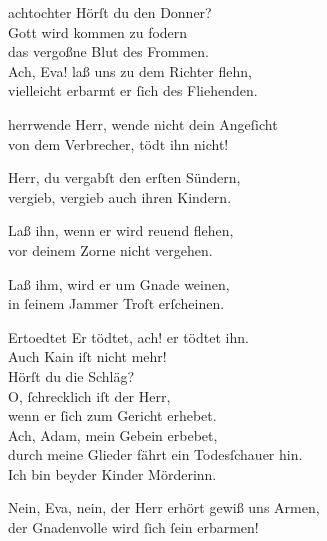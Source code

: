 \documentclass[tocstyle=ref-genre]{ees}
\begin{document}
{\begin{movement}{achtochter}
  \voice[Adam]
  Hörſt du den Donner?\\
  Gott wird kommen zu fodern\\
  das vergoßne Blut des Frommen.\\
  Ach, Eva! laß uns zu dem Richter flehn,\\
  vielleicht erbarmt er ſich des Fliehenden.
\end{movement}

\begin{movement}{herrwende}
  \voice[Adam]
  Herr, wende nicht dein Angeſicht\\
  von dem Verbrecher, tödt ihn nicht!

  \voice[Eva]
  Herr, du vergabſt den erſten Sündern,\\
  vergieb, vergieb auch ihren Kindern.

  \voice[Adam]
  Laß ihn, wenn er wird reuend flehen,\\
  vor deinem Zorne nicht vergehen.

  \voice[Eva]
  Laß ihm, wird er um Gnade weinen,\\
  in ſeinem Jammer Troſt erſcheinen.
\end{movement}

\begin{movement}{Ertoedtet}
  \voice[Eva]
  Er tödtet, ach! er tödtet ihn.\\
  Auch Kain iſt nicht mehr!\\
  Hörſt du die Schläg?\\
  O, ſchrecklich iſt der Herr,\\
  wenn er ſich zum Gericht erhebet.\\
  Ach, Adam, mein Gebein erbebet,\\
  durch meine Glieder fährt ein Todesſchauer hin.\\
  Ich bin beyder Kinder Mörderinn.

  \voice[Adam]
  Nein, Eva, nein, der Herr erhört gewiß uns Armen,\\
  der Gnadenvolle wird ſich ſein erbarmen!


\end{movement}}
\end{document}
